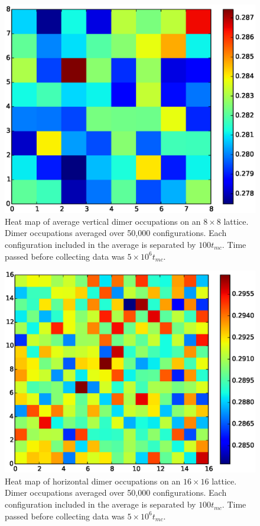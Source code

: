 \documentclass[aps,floatfix,11pt]{revtex4-1}
\begin{document}
\begin{figure}[h]
    \centering
    \includegraphics[width=8.5 cm]{grey_scale_avg_vert}
    \caption{Heat map of average vertical dimer occupations on an $8\times 8$ lattice. Dimer
        occupations averaged over 50,000 configurations. Each
        configuration included in the average is separated by $100t_{mc}$. Time passed before
        collecting data was $5\times 10^6 t_{mc}$. \label{fig:vert_avg_heat}}
\end{figure}


\begin{figure}[h]
    \centering
    \includegraphics[width=8.5 cm]{grey_scale_avg_horz_16x16}
    \caption{Heat map of horizontal dimer occupations on an $16\times 16$ lattice. Dimer
        occupations averaged over 50,000 configurations. Each
        configuration included in the average is separated by $100t_{mc}$. Time passed before
        collecting data was $5\times 10^6 t_{mc}$. \label{fig:horz_avg_heat_16x16}}
\end{figure}
\end{document}

